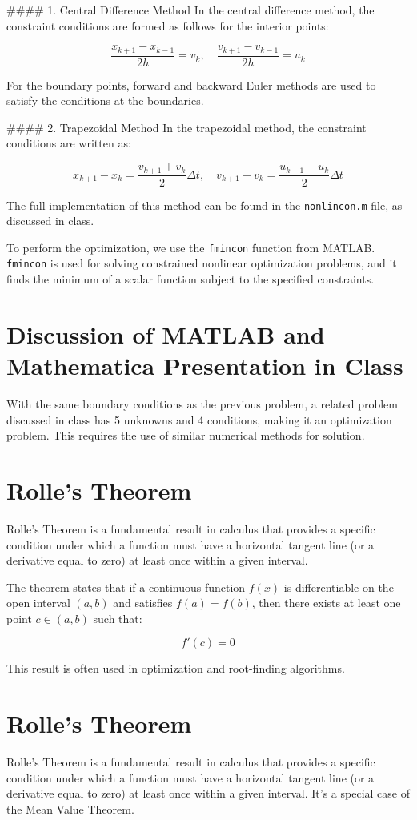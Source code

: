 \documentclass[12pt]{report} %
\begin{document}
#### 1. Central Difference Method
In the central difference method, the constraint conditions are formed as follows for the interior points:

\[
\frac{x_{k+1} - x_{k-1}}{2h} = v_k, \quad \frac{v_{k+1} - v_{k-1}}{2h} = u_k
\]

For the boundary points, forward and backward Euler methods are used to satisfy the conditions at the boundaries.

#### 2. Trapezoidal Method
In the trapezoidal method, the constraint conditions are written as:

\[
x_{k+1} - x_k = \frac{v_{k+1} + v_k}{2} \Delta t, \quad v_{k+1} - v_k = \frac{u_{k+1} + u_k}{2} \Delta t
\]

The full implementation of this method can be found in the \texttt{nonlincon.m} file, as discussed in class.

To perform the optimization, we use the \texttt{fmincon} function from MATLAB. \texttt{fmincon} is used for solving constrained nonlinear optimization problems, and it finds the minimum of a scalar function subject to the specified constraints.

\section{Discussion of MATLAB and Mathematica Presentation in Class}
With the same boundary conditions as the previous problem, a related problem discussed in class has 5 unknowns and 4 conditions, making it an optimization problem. This requires the use of similar numerical methods for solution.

\section{Rolle's Theorem}
Rolle’s Theorem is a fundamental result in calculus that provides a specific condition under which a function must have a horizontal tangent line (or a derivative equal to zero) at least once within a given interval.

The theorem states that if a continuous function \(f(x)\) is differentiable on the open interval \((a, b)\) and satisfies \(f(a) = f(b)\), then there exists at least one point \(c \in (a, b)\) such that:

\[
f'(c) = 0
\]

This result is often used in optimization and root-finding algorithms.

\section{Rolle's Theorem}
Rolle’s Theorem is a fundamental result in calculus that provides a specific condition under which a function must have a horizontal tangent line (or a derivative equal to zero) at least once within a given interval. It’s a special case of the Mean Value Theorem.
\end{document}
